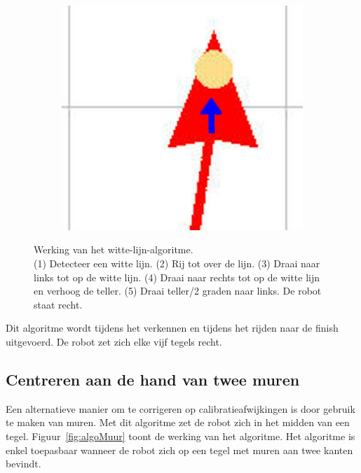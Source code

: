 \documentclass[t1]{penoverslag}
\begin{document}
\begin{figure}
\begin{subfigure}[hb]{0.2\textwidth}
        \end{subfigure}%
        \begin{subfigure}[hb]{0.2\textwidth}
                \centering
                \includegraphics[width=\textwidth]{witte_lijn5}
        \end{subfigure}
 \caption[Werking van het witte-lijn-algoritme.]{Werking van het witte-lijn-algoritme.\\(1) Detecteer een witte lijn. (2) Rij tot over de lijn. (3) Draai naar links tot op de witte lijn. (4) Draai naar rechts tot op de witte lijn en verhoog de teller. (5) Draai teller/2 graden naar links. De robot staat recht.}
\label{fig:algoWitteL}
\end{figure}

Dit algoritme wordt tijdens het verkennen en tijdens het rijden naar de finish uitgevoerd. De robot zet zich elke vijf tegels recht.

\subsection{Centreren aan de hand van twee muren} %
\label{ssec:algoMuren}
Een alternatieve manier om te corrigeren op calibratieafwijkingen is door gebruik te maken van muren. Met dit algoritme zet de robot zich in het midden van een tegel. Figuur~\ref{fig:algoMuur} toont de werking van het algoritme. Het algoritme is enkel toepasbaar wanneer de robot zich op een tegel met muren aan twee kanten bevindt.
\end{document}
